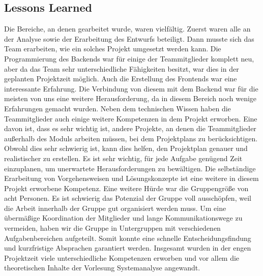 	\subsection{Lessons Learned}
	Die Bereiche, an denen gearbeitet wurde, waren vielfältig. Zuerst waren alle an der Analyse sowie der Erarbeitung des Entwurfs beteiligt. Dann musste sich das Team erarbeiten, wie ein solches Projekt umgesetzt werden kann. Die Programmierung des Backends war für einige der Teammitglieder komplett neu, aber da das Team sehr unterschiedliche Fähigkeiten besitzt, war dies in der geplanten Projektzeit möglich. Auch die Erstellung des Frontends war eine interessante Erfahrung. Die Verbindung von diesem mit dem Backend war für die meisten von uns eine weitere Herausforderung, da in diesem Bereich noch wenige Erfahrungen gemacht wurden. 
	Neben dem technischen Wissen haben die Teammitglieder auch einige weitere Kompetenzen in dem Projekt erworben. Eine davon ist, dass es sehr wichtig ist, andere Projekte, an denen die Teammitglieder außerhalb des Moduls arbeiten müssen, bei dem Projektplans zu berücksichtigen. Obwohl dies sehr schwierig ist, kann dies helfen, den Projektplan genauer und realistischer zu erstellen. Es ist sehr wichtig, für jede Aufgabe genügend Zeit einzuplanen, um unerwartete Herausforderungen zu bewältigen. Die selbständige Erarbeitung von Vorgehensweisen und Lösungskonzepte ist eine weitere in diesem Projekt erworbene Kompetenz.
	Eine weitere Hürde war die Gruppengröße von acht Personen. Es ist schwierig das Potenzial der Gruppe voll ausschöpfen, weil die Arbeit innerhalb der Gruppe gut organisiert werden muss.  Um eine übermäßige Koordination der Mitglieder und lange Kommunikationswege zu vermeiden, haben wir die Gruppe in Untergruppen mit verschiedenen Aufgabenbereichen aufgeteilt. Somit konnte eine schnelle Entscheidungsfindung und kurzfristige Absprachen garantiert werden. Insgesamt wurden in der engen Projektzeit viele unterschiedliche Kompetenzen erworben und vor allem die theoretischen Inhalte der Vorlesung Systemanalyse angewandt.
	